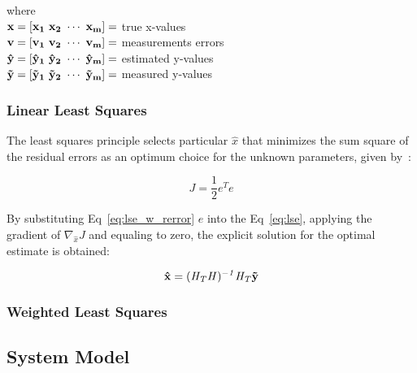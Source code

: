 where \\

$\bf{x} = \left[ x_{1} ~ x_{2} ~ \cdots ~ x_{m} \right] = $ true x-values \\

$\bf{v} = \left[ v_{1} ~ v_{2} ~ \cdots ~ v_{m} \right] = $ measurements errors \\

$\bf{\hat{y}} = \left[ \hat{y}_{1} ~ \hat{y}_{2} ~ \cdots ~ \hat{y}_{m} \right] = $ estimated y-values \\

$\bf{\tilde{y}} = \left[ \tilde{y}_{1} ~ \tilde{y}_{2} ~ \cdots ~ \tilde{y}_{m} \right] = $ measured y-values \\

\subsubsection{Linear Least Squares}
The least squares principle selects particular $\hat{x}$ that minimizes the sum square of the residual errors as an optimum choice for the unknown parameters, given by~\cite{crassidis2004dynamic}:

\begin{equation}
    J = \frac{1}{2} e^{T} e
    \label{eq:lse}
\end{equation}

By substituting Eq~\ref{eq:lse_w_rerror} $e$ into the Eq~\ref{eq:lse}, applying the gradient of $\nabla_{\hat{x}} J$ and equaling to zero, the explicit solution for the optimal estimate is obtained:

\begin{equation}
    \bf{\hat{x}} = (\it{H}_{T} \it{H})^{-1} \it{H}_{T} \bf{\tilde{y}}
\end{equation}


\subsubsection{Weighted Least Squares}



\subsection{System Model}


